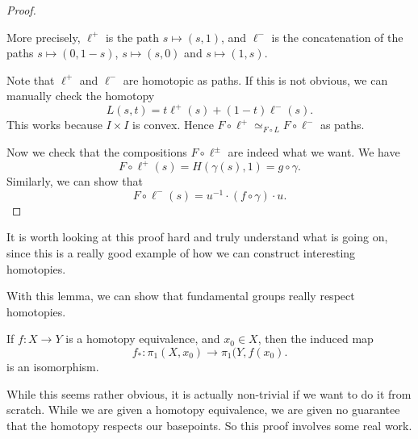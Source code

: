 \documentclass[a4paper]{article}
\begin{document}
\begin{proof}
\begin{center}
  \end{center}
  More precisely, $\ell^+$ is the path $s\mapsto (s, 1)$, and $\ell^-$ is the concatenation of the paths $s\mapsto (0, 1- s)$, $s \mapsto (s, 0)$ and $s\mapsto (1, s)$.

  Note that $\ell^+$ and $\ell^-$ are homotopic as paths. If this is not obvious, we can manually check the homotopy
  \[
    L(s, t) = t\ell^+(s) + (1 - t)\ell^- (s).
  \]
  This works because $I\times I$ is convex. Hence $F\circ \ell^+\simeq_{F\circ L} F\circ \ell^-$ as paths.

  Now we check that the compositions $F\circ \ell^{\pm}$ are indeed what we want. We have
  \[
    F\circ \ell^+ (s) = H(\gamma(s), 1) = g\circ \gamma.
  \]
  Similarly, we can show that
  \[
    F\circ \ell^-(s) = u^{-1}\cdot (f\circ \gamma)\cdot u.
  \]
\end{proof}
It is worth looking at this proof hard and truly understand what is going on, since this is a really good example of how we can construct interesting homotopies.

With this lemma, we can show that fundamental groups really respect homotopies.

\begin{thm}
  If $f: X\to Y$ is a homotopy equivalence, and $x_0 \in X$, then the induced map
  \[
    f_*: \pi_1(X, x_0) \to \pi_1(Y, f(x_0).
  \]
  is an isomorphism.
\end{thm}
While this seems rather obvious, it is actually non-trivial if we want to do it from scratch. While we are given a homotopy equivalence, we are given no guarantee that the homotopy respects our basepoints. So this proof involves some real work.
\end{document}
